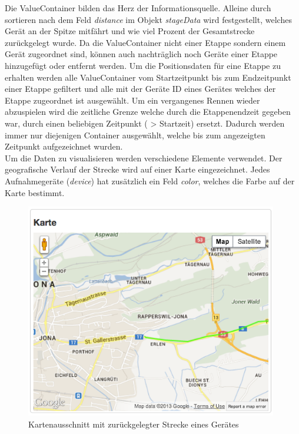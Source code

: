 Die ValueContainer bilden das Herz der Informationsquelle. Alleine durch sortieren nach dem Feld \textit{distance} im Objekt \textit{stageData} wird festgestellt, welches Gerät an der Spitze mitfährt und wie viel Prozent der Gesamtstrecke zurückgelegt wurde. Da die ValueContainer nicht einer Etappe sondern einem Gerät zugeordnet sind, können auch nachträglich noch Geräte einer Etappe hinzugefügt oder entfernt werden. Um die Positionsdaten für eine Etappe zu erhalten werden alle ValueContainer vom Startzeitpunkt bis zum Endzeitpunkt einer Etappe gefiltert und alle mit der Geräte ID eines Gerätes welches der Etappe zugeordnet ist ausgewählt. Um ein vergangenes Rennen wieder abzuspielen wird die zeitliche Grenze welche durch die Etappenendzeit gegeben war, durch einen beliebigen Zeitpunkt ( > Startzeit) ersetzt. Dadurch werden immer nur diejenigen Container ausgewählt, welche bis zum angezeigten Zeitpunkt aufgezeichnet wurden.
\\

Um die Daten zu visualisieren werden verschiedene Elemente verwendet. Der geografische Verlauf der Strecke wird auf einer Karte eingezeichnet. Jedes Aufnahmegeräte (\textit{device}) hat zusätzlich ein Feld \textit{color}, welches die Farbe auf der Karte bestimmt.
\begin{figure}[H]
	\centering
	\includegraphics[width=110mm]{images/tourliveweb/karte_neu.png}
	\caption{Kartenausschnitt mit zurückgelegter Strecke eines Gerätes}
\end{figure}

